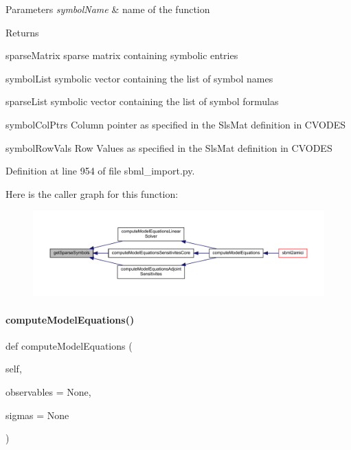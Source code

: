 \begin{DoxyParams}{Parameters}
{\em symbol\+Name} & name of the function\\
\hline
\end{DoxyParams}
\begin{DoxyReturn}{Returns}


sparse\+Matrix sparse matrix containing symbolic entries 

symbol\+List symbolic vector containing the list of symbol names 

sparse\+List symbolic vector containing the list of symbol formulas 

symbol\+Col\+Ptrs Column pointer as specified in the Sls\+Mat definition in C\+V\+O\+D\+ES 

symbol\+Row\+Vals Row Values as specified in the Sls\+Mat definition in C\+V\+O\+D\+ES 
\end{DoxyReturn}


Definition at line 954 of file sbml\+\_\+import.\+py.

Here is the caller graph for this function\+:
\nopagebreak
\begin{figure}[H]
\begin{center}
\leavevmode
\includegraphics[width=350pt]{classamici_1_1sbml__import_1_1_sbml_importer_ab2f94e5b08034c5e07a26886369b71fd_icgraph}
\end{center}
\end{figure}
\mbox{\label{classamici_1_1sbml__import_1_1_sbml_importer_a028d8f30b90a236b7f5e8335a6e87ff4}} 
\paragraph{\texorpdfstring{compute\+Model\+Equations()}{computeModelEquations()}}
{\footnotesize\ttfamily def compute\+Model\+Equations (\begin{DoxyParamCaption}\item[{}]{self,  }\item[{}]{observables = {\ttfamily None},  }\item[{}]{sigmas = {\ttfamily None} }\end{DoxyParamCaption})}


